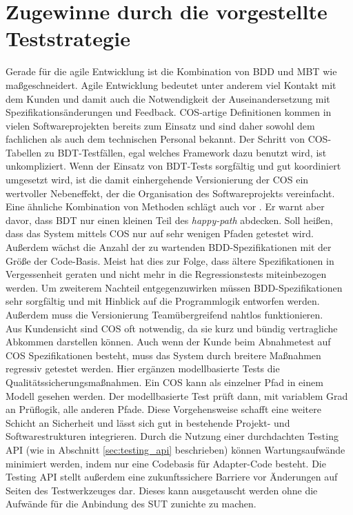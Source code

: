 \section{Zugewinne durch die vorgestellte Teststrategie}
Gerade für die agile Entwicklung ist die Kombination von BDD und \Gls{MBT} wie maßgeschneidert. Agile Entwicklung bedeutet unter anderem viel Kontakt mit dem Kunden und damit auch die Notwendigkeit der Auseinandersetzung mit Spezifikationsänderungen und Feedback. \Gls{COS}-artige Definitionen kommen in vielen Softwareprojekten bereits zum Einsatz und sind daher sowohl dem fachlichen als auch dem technischen Personal bekannt. Der Schritt von \Gls{COS}-Tabellen zu \Gls{BDT}-Testfällen, egal welches Framework dazu benutzt wird, ist unkompliziert. Wenn der Einsatz von \Gls{BDT}-Tests sorgfältig und gut koordiniert umgesetzt wird, ist die damit einhergehende Versionierung der \Gls{COS} ein wertvoller Nebeneffekt, der die Organisation des Softwareprojekts vereinfacht.\\
Eine ähnliche Kombination von Methoden schlägt auch \citeauthor{binder_model-based_2014} vor \cite{binder_model-based_2014}. Er warnt aber davor, dass \Gls{BDT} nur einen kleinen Teil des \textit{happy-path} abdecken. Soll heißen, dass das System mittels \Gls{COS} nur auf sehr wenigen Pfaden getestet wird. Außerdem wächst die Anzahl der zu wartenden \Gls{BDD}-Spezifikationen mit der Größe der Code-Basis. Meist hat dies zur Folge, dass ältere Spezifikationen in Vergessenheit geraten und nicht mehr in die Regressionstests miteinbezogen werden. Um zweiterem Nachteil entgegenzuwirken müssen \Gls{BDD}-Spezifikationen sehr sorgfältig und mit Hinblick auf die Programmlogik entworfen werden. Außerdem muss die Versionierung Teamübergreifend nahtlos funktionieren.\\
Aus Kundensicht sind \Gls{COS} oft notwendig, da sie kurz und bündig vertragliche Abkommen darstellen können. Auch wenn der Kunde beim Abnahmetest auf \Gls{COS} Spezifikationen besteht, muss das System durch breitere Maßnahmen regressiv getestet werden. Hier ergänzen modellbasierte Tests die Qualitätssicherungsmaßnahmen. Ein \Gls{COS} kann als einzelner Pfad in einem Modell gesehen werden. Der modellbasierte Test prüft dann, mit variablem Grad an Prüflogik, alle anderen Pfade. Diese Vorgehensweise schafft eine weitere Schicht an Sicherheit und lässt sich gut in bestehende Projekt- und Softwarestrukturen integrieren. Durch die Nutzung einer durchdachten Testing API (wie in Abschnitt \ref{sec:testing_api} beschrieben) können Wartungsaufwände minimiert werden, indem nur eine Codebasis für Adapter-Code besteht. Die Testing API stellt außerdem eine zukunftssichere Barriere vor Änderungen auf Seiten des Testwerkzeuges dar. Dieses kann ausgetauscht werden ohne die Aufwände für die Anbindung des \Gls{SUT} zunichte zu machen.\\
